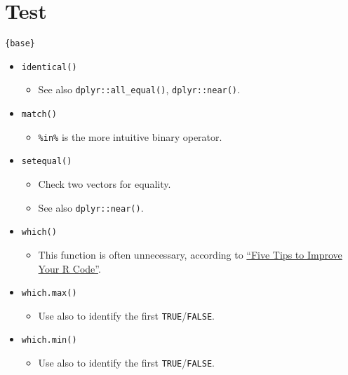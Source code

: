 \documentclass[
]{book}
\providecommand{\tightlist}{%
  \setlength{\itemsep}{0pt}\setlength{\parskip}{0pt}}
\begin{document}
\hypertarget{test-1}{%
\section{Test}\label{test-1}}

\texttt{\{base\}}

\begin{itemize}
\tightlist
\item
  \texttt{identical()}

  \begin{itemize}
  \tightlist
  \item
    See also \texttt{dplyr::all\_equal()}, \texttt{dplyr::near()}.
  \end{itemize}
\item
  \texttt{match()}

  \begin{itemize}
  \tightlist
  \item
    \texttt{\%in\%} is the more intuitive binary operator.
  \end{itemize}
\item
  \texttt{setequal()}

  \begin{itemize}
  \tightlist
  \item
    Check two vectors for equality.
  \item
    See also \texttt{dplyr::near()}.
  \end{itemize}
\item
  \texttt{which()}

  \begin{itemize}
  \tightlist
  \item
    This function is often unnecessary, according to \href{https://www.datacamp.com/community/tutorials/five-tips-r-code-improve}{``Five Tips to Improve Your R Code''}.
  \end{itemize}
\item
  \texttt{which.max()}

  \begin{itemize}
  \tightlist
  \item
    Use also to identify the first \texttt{TRUE}/\texttt{FALSE}.
  \end{itemize}
\item
  \texttt{which.min()}

  \begin{itemize}
  \tightlist
  \item
    Use also to identify the first \texttt{TRUE}/\texttt{FALSE}.
  \end{itemize}
\end{itemize}
\end{document}
